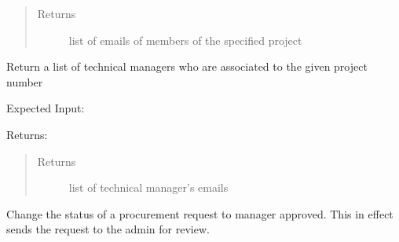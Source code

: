 \documentclass[letterpaper,10pt,english]{sphinxmanual}
\begin{document}
\begin{fulllineitems}
\begin{fulllineitems}
\begin{quote}
\begin{description}
\item[{Returns}] \leavevmode
list of emails of members of the specified project

\end{description}\end{quote}

\end{fulllineitems}


\begin{fulllineitems}
\label{\detokenize{apidoc/utdesign_procurement:utdesign_procurement.apigateway.ApiGateway.managerList}}
Return a list of technical managers who are associated to the given
project number

Expected Input:

\begin{sphinxVerbatim}[commandchars=\\\{\}]
     
\end{sphinxVerbatim}

Returns:

\begin{sphinxVerbatim}[commandchars=\\\{\}]
\PYG{p}{[}
\PYG{p}{]}
\end{sphinxVerbatim}
\begin{quote}\begin{description}
\item[{Returns}] \leavevmode
list of technical manager’s emails

\end{description}\end{quote}

\end{fulllineitems}


\begin{fulllineitems}
\label{\detokenize{apidoc/utdesign_procurement:utdesign_procurement.apigateway.ApiGateway.procurementApproveManager}}
Change the status of a procurement request to manager approved.
This in effect sends the request to the admin for review.


\end{fulllineitems}
\end{fulllineitems}
\end{document}
